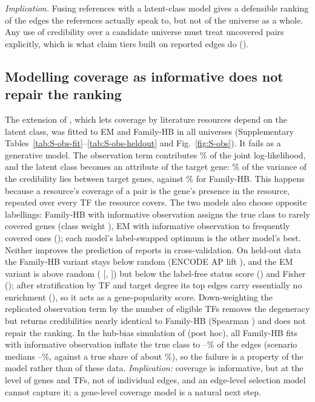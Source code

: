 \emph{Implication.} Fusing references with a latent-class model gives a defensible ranking of the edges the references actually speak to, but not of the universe as a whole. Any use of credibility over a candidate universe must treat uncovered pairs explicitly, which is what claim tiers built on reported edges do ().


\subsection{Modelling coverage as informative does not repair the ranking}\label{sec:res-obs}

The extension of , which lets coverage by literature resources depend on the latent class, was fitted to EM and Family-HB in all universes (Supplementary Tables~\ref{tab:S-obs-fit}--\ref{tab:S-obs-heldout} and Fig.~\ref{fig:S-obs}).
It fails as a generative model.
The observation term contributes \nObsShare{}\% of the joint log-likelihood, and the latent class becomes an attribute of the target gene: \nObsVar{}\% of the variance of the credibility lies between target genes, against \nObsVarHb{}\% for Family-HB.
This happens because a resource's coverage of a pair is the gene's presence in the resource, repeated over every TF the resource covers.
The two models also choose opposite labellings: Family-HB with informative observation assigns the true class to rarely covered genes (class weight \nObsWtHbObs{}), EM with informative observation to frequently covered ones (\nObsWtEmObs{}); each model's label-swapped optimum is the other model's best.
Neither improves the prediction of reports in cross-validation.
On held-out data the Family-HB variant stays below random (ENCODE AP lift \nObsApHbObs{}), and the EM variant is above random (\nObsApEmObs{} [\nObsApEmObsLo{}, \nObsApEmObsHi{}]) but below the label-free status score (\nObsApStatus{}) and Fisher (\nObsApFisher{}); after stratification by TF and target degree its top \nEvalK{} edges carry essentially no enrichment (\nObsSenrEmObs{}), so it acts as a gene-popularity score.
Down-weighting the replicated observation term by the number of eligible TFs removes the degeneracy but returns credibilities nearly identical to Family-HB (Spearman \nObsTfwSp{}) and does not repair the ranking.
In the hub-bias simulation of  (post hoc), all \nObsSimN{} Family-HB fits with informative observation inflate the true class to \nObsSimWtAllPctMin{}--\nObsSimWtAllPctMax{}\% of the edges (scenario medians \nObsSimWtPctMin{}--\nObsSimWtPctMax{}\%, against a true share of about \nObsSimTruePct{}\%), so the failure is a property of the model rather than of these data.
\emph{Implication:} coverage is informative, but at the level of genes and TFs, not of individual edges, and an edge-level selection model cannot capture it; a gene-level coverage model is a natural next step.

